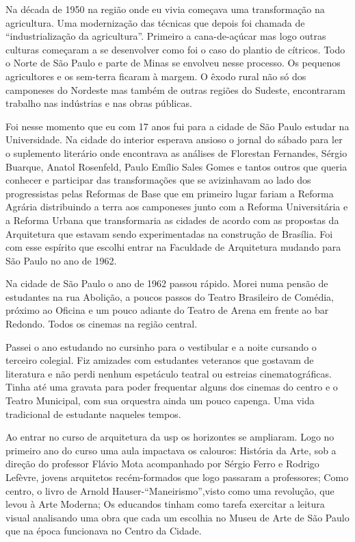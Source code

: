 Na década de 1950 na região onde eu vivia começava uma transformação na
agricultura. Uma modernização das técnicas que depois foi chamada de
“industrialização da agricultura”. Primeiro a cana-de-açúcar mas logo
outras culturas começaram a se desenvolver como foi o caso do plantio de
cítricos. Todo o Norte de São Paulo e parte de Minas se envolveu nesse
processo. Os pequenos agricultores e os sem-terra ficaram à margem. O
êxodo rural não só dos camponeses do Nordeste mas também de outras
regiões do Sudeste, encontraram trabalho nas indústrias e nas obras
públicas.

Foi nesse momento que eu com 17 anos fui para a cidade de São Paulo
estudar na Universidade. Na cidade do interior esperava ansioso o jornal
do sábado para ler o suplemento literário onde encontrava as análises de
Florestan Fernandes, Sérgio Buarque, Anatol Rosenfeld, Paulo Emílio
Sales Gomes e tantos outros que queria conhecer e participar das
transformações que se avizinhavam ao lado dos progressistas pelas
Reformas de Base que em primeiro lugar fariam a Reforma Agrária
distribuindo a terra aos camponeses junto com a Reforma Universitária e
a Reforma Urbana que transformaria as cidades de acordo com as propostas
da Arquitetura que estavam sendo experimentadas na construção de
Brasília. Foi com esse espírito que escolhi entrar na Faculdade de
Arquitetura mudando para São Paulo no ano de 1962.

\subject{São Paulo e a {\cap fau}}

Na cidade de São Paulo o ano de 1962 passou rápido. Morei numa pensão de
estudantes na rua Abolição, a poucos passos do Teatro Brasileiro de
Comédia, próximo ao Oficina e um pouco adiante do Teatro de Arena em
frente ao bar Redondo. Todos os cinemas na região central.

Passei o ano estudando no cursinho para o vestibular e a noite cursando
o terceiro colegial. Fiz amizades com estudantes veteranos que gostavam
de literatura e não perdi nenhum espetáculo teatral ou estreias
cinematográficas. Tinha até uma gravata para poder frequentar alguns dos
cinemas do centro e o Teatro Municipal, com sua orquestra ainda um pouco
capenga. Uma vida tradicional de estudante naqueles tempos.

Ao entrar no curso de arquitetura da {\sc usp} os horizontes se ampliaram.
Logo no primeiro ano do curso uma aula impactava os calouros: História
da Arte, sob a direção do professor Flávio Mota acompanhado por Sérgio
Ferro e Rodrigo Lefèvre, jovens arquitetos recém-formados que logo
passaram a professores; Como centro, o livro de Arnold
Hauser-“Maneirismo”,visto como uma revolução, que levou à Arte Moderna;
Os educandos tinham como tarefa exercitar a leitura visual analisando
uma obra que cada um escolhia no Museu de Arte de São Paulo que na época
funcionava no Centro da Cidade.

